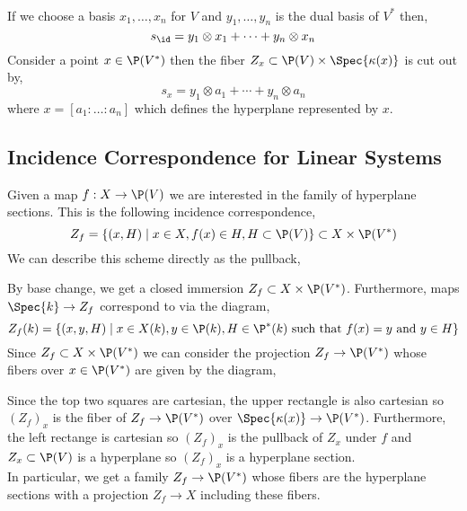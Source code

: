 \documentclass[12pt]{article}
\begin{document}
\bigskip\\
If we choose a basis $x_1, \dots, x_n$ for $V$ and $y_1, \dots, y_n$ is the dual basis of $V^*$ then,
\[ s_\id = y_1 \otimes x_1 + \cdots + y_n \otimes x_n \]
Consider a point $x \in \P(V^*)$ then the fiber $Z_x \subset \P(V) \times \Spec{\kappa(x)}$ is cut out by,
\[ s_x = y_1 \otimes a_1 + \cdots + y_n \otimes a_n \]
where $x = [a_1 : \dots : a_n]$ which defines the hyperplane represented by $x$. 

\subsection{Incidence Correspondence for Linear Systems}

Given a map $f : X \to \P(V)$ we are interested in the family of hyperplane sections. This is the following incidence correspondence,
\[ Z_f = \{ (x, H) \mid x \in X, f(x) \in H, H \subset \P(V) \} \subset X \times \P(V^*) \]
We can describe this scheme directly as the pullback,
\begin{center}
\end{center}
By base change, we get a closed immersion $Z_f \subset X \times \P(V^*)$. Furthermore, maps $\Spec{k} \to Z_f$ correspond to via the diagram,
\[ Z_f(k) = \{ (x,y,H) \mid x \in X(k), y \in \P(k), H \in \P^*(k) \text{ such that } f(x) = y \text{ and } y \in H \} \] 
Since $Z_f \subset X \times \P(V^*)$ we can consider the projection $Z_f \to \P(V^*)$ whose fibers over $x \in \P(V^*)$ are given by the diagram, 
\begin{center}
\end{center}
Since the top two squares are cartesian, the upper rectangle is also cartesian so $(Z_f)_x$ is the fiber of $Z_f \to \P(V^*)$ over $\Spec{\kappa(x)} \to \P(V^*)$. Furthermore, the left rectange is cartesian so $(Z_f)_x$ is the pullback of $Z_x$ under $f$ and $Z_x \subset \P(V)$ is a hyperplane so $(Z_f)_x$ is a hyperplane section.
\bigskip\\
In particular, we get a family $Z_f \to \P(V^*)$ whose fibers are the hyperplane sections with a projection $Z_f \to X$ including these fibers. 
\end{document}
